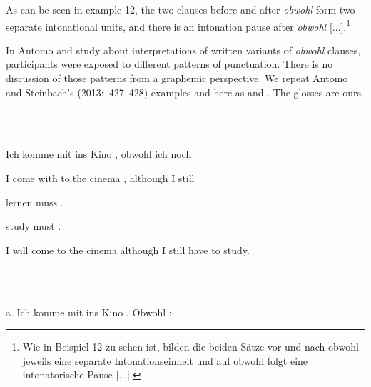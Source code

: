 \begin{styleMoutonQuote}
As can be seen in exam\-ple 12, the two clauses before and after \textit{obwohl} form two separate intonational units, and there is an intonation pause after \textit{obwohl} [...].\footnote{Wie in Beispiel 12 zu sehen ist, bilden die beiden Sätze vor und nach obwohl jeweils eine separate Intonationseinheit und auf obwohl folgt eine intonatorische Pause [...].}
\end{styleMoutonQuote}

\begin{styleMoutonTextBetweenExamples}
In Antomo and  study about interpretations of written variants of \textit{obwohl} clauses, participants were exposed to different patterns of punctuation. There is no discussion of those patterns from a graphemic perspective. We repeat Antomo and Steinbach’s (2013:~427–428) examples  and  here as  and . The glosses are ours.
\end{styleMoutonTextBetweenExamples}

\begin{styleMoutonExample}
\ea%
    \label{ex:key:6}
    \gll\\
        \\
    \glt
    \z

          Ich  komme  mit  ins  Kino    ,  obwohl  ich  noch
\end{styleMoutonExample}

\begin{styleMoutonExampleAlpha}
I  come    with  to.the  cinema  ,  although  I  still
\end{styleMoutonExampleAlpha}

\begin{styleMoutonExampleAlpha}
lernen  muss  .
\end{styleMoutonExampleAlpha}

\begin{styleMoutonExampleAlpha}
study    must  .
\end{styleMoutonExampleAlpha}

\begin{styleMoutonExampleTrans}
I will come to the cinema although I still have to study.
\end{styleMoutonExampleTrans}

\begin{styleMoutonExample}
\ea%
    \label{ex:key:7}
    \gll\\
        \\
    \glt
    \z

          a.  Ich  komme  mit  ins  Kino    .  Obwohl  :
\end{styleMoutonExample}

